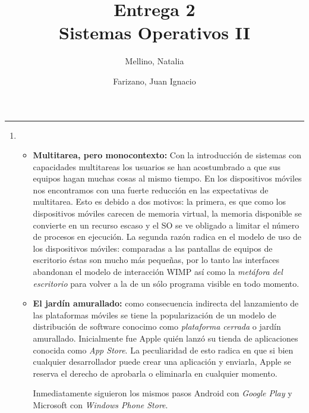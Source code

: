 \documentclass[11pt]{article}
\title{
    Entrega 2 \\
    \large Sistemas Operativos II}
\author{Mellino, Natalia \and Farizano, Juan Ignacio}
\date{}
\begin{document}
\maketitle
\noindent\rule{\textwidth}{1pt}

\begin{enumerate}[1)]
  \section*{Historia}
  \item  
    \begin{itemize}
      \item \textbf{Multitarea, pero monocontexto:}
        Con la introducción de sistemas con capacidades multitareas los usuarios
        se han acostumbrado a que sus equipos hagan muchas cosas al mismo tiempo.
        En los dispositivos móviles nos encontramos con una fuerte reducción en
        las expectativas de multitarea. Esto es debido a dos motivos: la primera,
        es que como los dispositivos móviles carecen de memoria virtual, la memoria 
        disponible se convierte en un recurso escaso y el SO se ve obligado a limitar el
        número de procesos en ejecución. La segunda razón radica en el modelo de uso
        de los dispositivos móviles: comparadas a las pantallas de equipos de escritorio
        éstas son mucho más pequeñas, por lo tanto las interfaces abandonan el modelo 
        de interacción WIMP así como la \emph{metáfora del escritorio} para volver a la de un
        sólo programa visible en todo momento.
        
      \item \textbf{El jardín amurallado:} como consecuencia indirecta del lanzamiento
      de las plataformas móviles se tiene la popularización de un modelo de distribución
      de software conocimo como \emph{plataforma cerrada} o jardín amurallado. Inicialmente fue 
      Apple quién lanzó su tienda de aplicaciones conocida como \emph{App Store}. La 
      peculiaridad de esto radica en que si bien cualquier desarrollador puede crear una
      aplicación y enviarla, Apple se reserva el derecho de aprobarla o eliminarla en
      cualquier momento.

      Inmediatamente siguieron los mismos pasos Android con \emph{Google Play} y Microsoft 
      con \emph{Windows Phone Store}. 


\end{itemize}
\end{enumerate}
\end{document}
